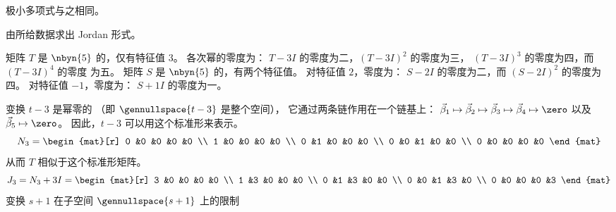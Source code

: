 \begin{exercises}
\begin{answer}
\begin{exparts}
          极小多项式与之相同。
      \end{exparts}
    \end{answer}
  \recommended \item
    由所给数据求出 Jordan 形式。
    \begin{exparts}
       \partsitem 矩阵 
         \( T \) 是 \( \nbyn{5} \) 的，仅有特征值 $3$。
         各次幂的零度为：
         \( T-3I \) 的零度为二，\( (T-3I)^2 \) 的零度为三，
         \( (T-3I)^3 \) 的零度为四，而 \( (T-3I)^4 \) 的零度
         为五。
       \partsitem 矩阵 \( S \) 是 \( \nbyn{5} \) 的，有两个特征值。
         对特征值 $2$，零度为：
         \( S-2I \) 的零度为二，而 \( (S-2I)^2 \) 的零度为四。
         对特征值 $-1$，零度为：
         \( S+1I \) 的零度为一。
    \end{exparts}
    \begin{answer}
      \begin{exparts}
         \partsitem 变换 $t-3$ 是幂零的
          （即 $\gennullspace{t-3}$ 是整个空间），
          它通过两条链作用在一个链基上：
          $\vec{\beta}_1\mapsto\vec{\beta}_2\mapsto\vec{\beta}_3
            \mapsto\vec{\beta}_4\mapsto\zero$
          以及 $\vec{\beta}_5\mapsto\zero$。
          因此，$t-3$ 可以用这个标准形来表示。
          \begin{equation*}
            N_3=
            \begin{mat}[r]
               0  &0  &0  &0  &0  \\
               1  &0  &0  &0  &0  \\
               0  &1  &0  &0  &0  \\
               0  &0  &1  &0  &0  \\
               0  &0  &0  &0  &0
             \end{mat}
          \end{equation*}
          从而 $T$ 相似于这个标准形矩阵。
          \begin{equation*}
           J_3=N_3+3I=
           \begin{mat}[r]
               3  &0  &0  &0  &0  \\
               1  &3  &0  &0  &0  \\
               0  &1  &3  &0  &0  \\
               0  &0  &1  &3  &0  \\
               0  &0  &0  &0  &3
             \end{mat}
          \end{equation*} 
         \partsitem 变换 $s+1$ 在子空间 $\gennullspace{s+1}$ 上的限制

\end{exparts}
\end{answer}
\end{exercises}
